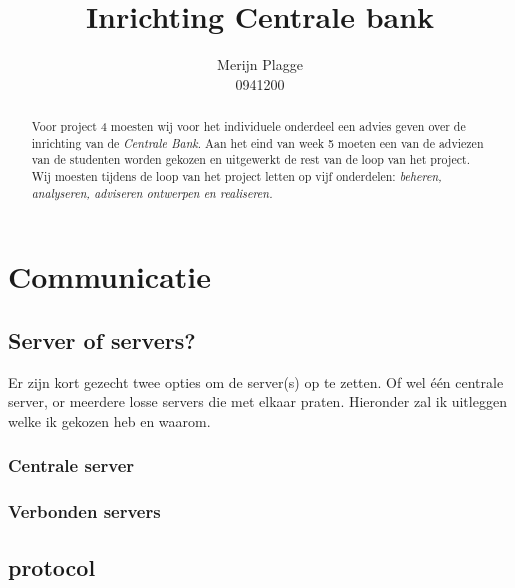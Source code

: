 \documentclass{article}
\begin{document}
\title{\huge{Inrichting Centrale bank} }
\author{Merijn Plagge \\ 0941200}

\maketitle

\begin{abstract}

Voor project 4 moesten wij voor het individuele onderdeel een advies geven over de inrichting van de \emph{Centrale Bank}.
Aan het eind van week 5 moeten een van de adviezen van de studenten worden gekozen en uitgewerkt de rest van de loop van het project.
Wij moesten tijdens de loop van het project letten op vijf onderdelen: \emph{beheren, analyseren, adviseren ontwerpen en realiseren.}

\end{abstract}

\newpage

\tableofcontents

\newpage

\section{Communicatie}

\subsection{Server of servers?} 

Er zijn kort gezecht twee opties om de server(s) op te zetten.
Of wel \'e\'en centrale server, or meerdere losse servers die met elkaar praten.
Hieronder zal ik uitleggen welke ik gekozen heb en waarom.


\subsubsection{Centrale server}

\subsubsection{Verbonden servers}

\subsection{protocol}
\end{document}

